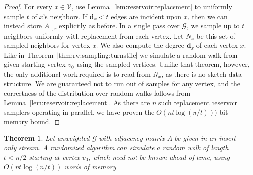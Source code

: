 \documentclass[10]{report}
\newtheorem{theorem}{Theorem}[section]
\begin{document}
\begin{proof}
For every $x \in \mathcal{V}$, use Lemma~\ref{lem:reservoir:replacement} to uniformly sample $t$ of $x$'s neighbors.
If $\mathbf{d}_x < t$ edges are incident upon $x$, then we can instead store $A_{:,x}$ explicitly as before.
In a single pass over $\mathcal{G}$, we sample up to $t$ neighbors uniformly with replacement from each vertex.
Let $N_x$ be this set of sampled neighbors for vertex $x$.
We also compute the degree $\mathbf{d}_x$ of each vertex $x$.
Like in Theorem~\ref{thm:rw:sampling:turnstile} we simulate a random walk from given starting vertex $v_0$ using the sampled vertices. 
Unlike that theorem, however, the only additional work required is to read from $N_x$, as there is no sketch data structure. 
We are guaranteed not to run out of samples for any vertex, and the correctness of the distribution over random walks follows from Lemma~\ref{lem:reservoir:replacement}.
As there are $n$ such replacement reservoir samplers operating in parallel, we have proven the $O(nt\log(n/t)))$ bit memory bound.

\end{proof}

\begin{theorem} \label{thm:rw:sampling:weighted:insert-only}
Let unweighted $\mathcal{G}$ with adjacency matrix $A$ be given in an insert-only stream.
A randomized algorithm can simulate a random walk of length $t < n/2$ starting at vertex $v_0$, which need not be known ahead of time, using $O(nt \log (n/t))$ words of memory.
\end{theorem}
\end{document}
